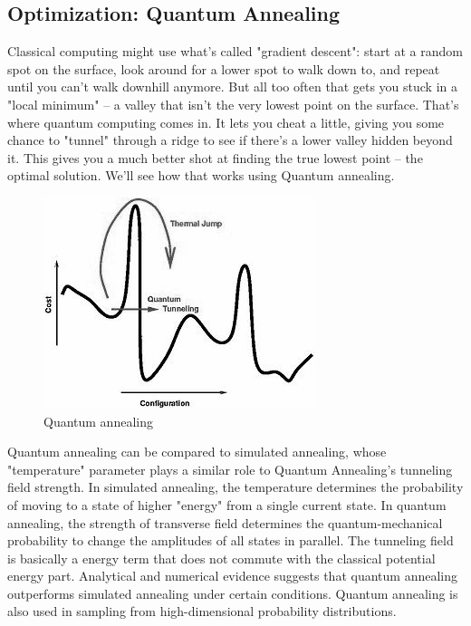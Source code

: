 \subsection{Optimization: Quantum Annealing}
Classical computing might use what's called "gradient descent": start at a random spot on the surface, look around for a lower spot to walk down to, and repeat until you can't walk downhill anymore. But all too often that gets you stuck in a "local minimum" -- a valley that isn't the very lowest point on the surface.
That's where quantum computing comes in. It lets you cheat a little, giving you some chance to "tunnel" through a ridge to see if there's a lower valley hidden beyond it. This gives you a much better shot at finding the true lowest point -- the optimal solution. We'll see how that works using Quantum annealing.\par\bigskip
\begin{figure}[H]
\centering\includegraphics[width=.4\textwidth]{images/anneal.png}
\caption{Quantum annealing}
\end{figure}
Quantum annealing\cite{quananneal} can be compared to simulated annealing, whose "temperature" parameter plays a similar role to Quantum Annealing's tunneling field strength. In simulated annealing, the temperature determines the probability of moving to a state of higher "energy" from a single current state. In quantum annealing, the strength of transverse field determines the quantum-mechanical probability to change the amplitudes of all states in parallel.
The tunneling field is basically a energy term that does not commute with the classical potential energy part. Analytical and numerical evidence suggests that quantum annealing outperforms simulated annealing under certain conditions. Quantum annealing is also used in sampling from high-dimensional probability distributions.
